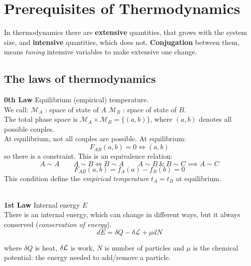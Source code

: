 \section{Prerequisites of Thermodynamics}
In thermodynamics there are \textbf{extensive} quantities, that grows with the system size, and \textbf{intensive} quantities, which does not. \textbf{Conjugation} between them, means \textit{tuning} intensive variables to make extensive one change.


\subsection{The laws of thermodynamics}
\textbf{0th Law} Equilibrium (empirical) temperature.\\

We call: \qquad $\mathcal{M}_A$ : space of state of $A$\qquad
$\mathcal{M}_B$ : space of state of $B$.\\
The total phase space is $\mathcal{M}_A \times \mathcal{M}_B = \{(a,b)\}$,   where $(a,b)$ denotes all possible couples.\\

At equilibrium, not all couples are possible. At equilibrium:
$$
    F_{AB}(a,b) = 0 \iff (a,b)
$$
so there is a constraint. This is an equivalence relation:
$$
    A\sim A \qquad A \sim B \iff B \sim A \qquad A \sim B \ \& \  B\sim C \implies A\sim C
$$  
$$
    F_{AB}(a,b) = f_A(a) - f_B(b) = 0
$$
This condition define the \textit{empirical temperature} $t_A = t_B$ at equilibrium.

\\

\textbf{1st Law} Internal energy $E$\\

There is an internal energy, which can change in different ways, but it always conserved (\textit{conservation of energy}).
$$ dE = \delta Q - \delta  \mathcal{L} + \mu dN $$

where $\delta Q$ is heat, $\delta \mathcal{L}$ is work, $N$ is number of particles and $\mu$ is the chemical potential: the energy needed to add/remove a particle.\\

\\

